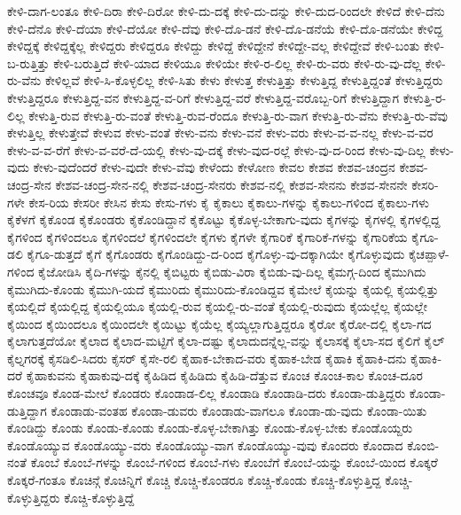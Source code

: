 {ಕೇಳಿ-ದಾಗ-ಲಂತೂ
ಕೇಳಿ-ದಿರಾ
ಕೇಳಿ-ದಿರೋ
ಕೇಳಿ-ದು-ದಕ್ಕೆ
ಕೇಳಿ-ದು-ದನ್ನು
ಕೇಳಿ-ದುದ-ರಿಂದಲೇ
ಕೇಳಿದೆ
ಕೇಳಿ-ದೆನು
ಕೇಳಿ-ದೆನೊ
ಕೇಳಿ-ದೆಯಾ
ಕೇಳಿ-ದೆಯೋ
ಕೇಳಿ-ದೆವು
ಕೇಳಿ-ದೊ-ಡನೆ
ಕೇಳಿ-ದೊ-ಡನೆಯೆ
ಕೇಳಿ-ದೊ-ಡನೆಯೇ
ಕೇಳಿದ್ದ
ಕೇಳಿದ್ದಕ್ಕೆ
ಕೇಳಿದ್ದಕ್ಕೆಲ್ಲ
ಕೇಳಿದ್ದರು
ಕೇಳಿದ್ದರೂ
ಕೇಳಿದ್ದು
ಕೇಳಿದ್ದೆ
ಕೇಳಿದ್ದೇನೆ
ಕೇಳಿದ್ದೇ-ವಲ್ಲ
ಕೇಳಿದ್ದೇವೆ
ಕೇಳಿ-ಬಂತು
ಕೇಳಿ-ಬ-ರುತ್ತಿತ್ತು
ಕೇಳಿ-ಬರುತ್ತಿದೆ
ಕೇಳಿ-ಯಾದ
ಕೇಳಿಯೂ
ಕೇಳಿಯೇ
ಕೇಳಿ-ರ-ಲಿಲ್ಲ
ಕೇಳಿ-ರು-ವರು
ಕೇಳಿ-ರು-ವು-ದೆಲ್ಲ
ಕೇಳಿ-ರು-ವೆನು
ಕೇಳಿಲ್ಲವೆ
ಕೇಳಿ-ಸಿ-ಕೊಳ್ಳಲಿಲ್ಲ
ಕೇಳಿ-ಸಿತು
ಕೇಳು
ಕೇಳುತ್ತ
ಕೇಳುತ್ತಿತ್ತು
ಕೇಳುತ್ತಿದ್ದ
ಕೇಳುತ್ತಿದ್ದಂತೆ
ಕೇಳುತ್ತಿದ್ದರು
ಕೇಳುತ್ತಿದ್ದರೂ
ಕೇಳುತ್ತಿದ್ದ-ವನ
ಕೇಳುತ್ತಿದ್ದ-ವ-ರಿಗೆ
ಕೇಳುತ್ತಿದ್ದ-ವರೆ
ಕೇಳುತ್ತಿದ್ದ-ವರೊಬ್ಬ-ರಿಗೆ
ಕೇಳುತ್ತಿದ್ದಾಗ
ಕೇಳುತ್ತಿ-ರ-ಲಿಲ್ಲ
ಕೇಳುತ್ತಿ-ರುವ
ಕೇಳುತ್ತಿ-ರು-ವಂತೆ
ಕೇಳುತ್ತಿ-ರುವ-ರೆಂದೂ
ಕೇಳುತ್ತಿ-ರು-ವಾಗ
ಕೇಳುತ್ತಿ-ರು-ವೆನು
ಕೇಳುತ್ತಿ-ರು-ವೆವು
ಕೇಳುತ್ತಿಲ್ಲ
ಕೇಳುತ್ತೇವೆ
ಕೇಳುವ
ಕೇಳು-ವಂತೆ
ಕೇಳು-ವನು
ಕೇಳು-ವನೆ
ಕೇಳು-ವರು
ಕೇಳು-ವ-ವ-ನಲ್ಲ
ಕೇಳು-ವ-ವರ
ಕೇಳು-ವ-ವ-ರೆಗೆ
ಕೇಳು-ವ-ವರೆ-ದೆ-ಯಲ್ಲಿ
ಕೇಳು-ವು-ದಕ್ಕೆ
ಕೇಳು-ವುದ-ರಲ್ಲೆ
ಕೇಳು-ವು-ದ-ರಿಂದ
ಕೇಳು-ವು-ದಿಲ್ಲ
ಕೇಳು-ವುದು
ಕೇಳು-ವುದೆಂದರೆ
ಕೇಳು-ವುದೇ
ಕೇಳು-ವೆವು
ಕೇಳೆಂದು
ಕೇಳೋಣ
ಕೇವಲ
ಕೇಶವ
ಕೇಶವ-ಚಂದ್ರನ
ಕೇಶವ-ಚಂದ್ರ-ಸೇನ
ಕೇಶವ-ಚಂದ್ರ-ಸೇನ-ನಲ್ಲಿ
ಕೇಶವ-ಚಂದ್ರ-ಸೇನರು
ಕೇಶವ-ನಲ್ಲಿ
ಕೇಶವ-ಸೇನನು
ಕೇಶವ-ಸೇನನೇ
ಕೇಸರಿ-ಗಳೇ
ಕೇಸ-ರಿಯ
ಕೇಸರೀ
ಕೇಸಿನ
ಕೇಸು
ಕೇಸು-ಗಳು
ಕೈ
ಕೈಕಾಲು
ಕೈಕಾಲು-ಗಳನ್ನು
ಕೈಕಾಲು-ಗಳಿಂದ
ಕೈಕಾಲು-ಗಳು
ಕೈಕೆಳಗೆ
ಕೈಕೊಂಡ
ಕೈಕೊಂಡರು
ಕೈಕೊಂಡಿದ್ದಾನೆ
ಕೈಕೊಟ್ಟು
ಕೈಕೊಳ್ಳ-ಬೇಕಾಗು-ವುದು
ಕೈಗಳನ್ನು
ಕೈಗಳಲ್ಲಿ
ಕೈಗಳಲ್ಲಿದ್ದ
ಕೈಗಳಿಂದ
ಕೈಗಳಿಂದಲೂ
ಕೈಗಳಿಂದಲೆ
ಕೈಗಳಿಂದಲೇ
ಕೈಗಳು
ಕೈಗಳೇ
ಕೈಗಾರಿಕೆ
ಕೈಗಾರಿಕೆ-ಗಳನ್ನು
ಕೈಗಾರಿಕೆಯ
ಕೈಗೂ-ಡಲಿ
ಕೈಗೂ-ಡುತ್ತದೆ
ಕೈಗೆ
ಕೈಗೊಂಡರು
ಕೈಗೊಂಡಿದ್ದು-ದ-ರಿಂದ
ಕೈಗೊಳ್ಳು-ವು-ದಕ್ಕಾಗಿಯೇ
ಕೈಗೊಳ್ಳುವುದು
ಕೈಚಪ್ಪಾಳೆ-ಗಳಿಂದ
ಕೈಜೋಡಿಸಿ
ಕೈದಿ-ಗಳನ್ನು
ಕೈನಲ್ಲಿ
ಕೈಬಿಟ್ಟರು
ಕೈಬಿಡು-ವಿರಾ
ಕೈಬಿಡು-ವು-ದಿಲ್ಲ
ಕೈಮಗ್ಗ-ದಿಂದ
ಕೈಮುಗಿದು
ಕೈಮುಗಿದು-ಕೊಂಡು
ಕೈಮುಗಿ-ಯದೆ
ಕೈಮುರಿದು
ಕೈಮುರಿದು-ಕೊಂಡಿದ್ದವ
ಕೈಮೇಲೆ
ಕೈಯನ್ನು
ಕೈಯಲ್ಲಿ
ಕೈಯಲ್ಲಿತ್ತು
ಕೈಯಲ್ಲಿದೆ
ಕೈಯಲ್ಲಿದ್ದ
ಕೈಯಲ್ಲಿಯೂ
ಕೈಯಲ್ಲಿ-ರುವ
ಕೈಯಲ್ಲಿ-ರು-ವಂತೆ
ಕೈಯಲ್ಲಿ-ರುವುದು
ಕೈಯಲ್ಲೆಲ್ಲ
ಕೈಯಲ್ಲೇ
ಕೈಯಿಂದ
ಕೈಯಿಂದಲೂ
ಕೈಯಿಂದಲೇ
ಕೈಯಿಟ್ಟು
ಕೈಯೆಲ್ಲ
ಕೈಯ್ಯಲ್ಲಾಗುತ್ತಿದ್ದರೂ
ಕೈರೋ
ಕೈರೋ-ದಲ್ಲಿ
ಕೈಲಾ-ಗದ
ಕೈಲಾಗುತ್ತದೆಯೋ
ಕೈಲಾದ
ಕೈಲಾದ-ಮಟ್ಟಿಗೆ
ಕೈಲಾ-ದಷ್ಟು
ಕೈಲಾದುದನ್ನೆಲ್ಲ-ವನ್ನು
ಕೈಲಾಸಕ್ಕೆ
ಕೈಲಾ-ಸದ
ಕೈಲಿಗೆ
ಕೈಲ್
ಕೈಲ್ನಗರಕ್ಕೆ
ಕೈಸಡಿಲಿ-ಸಿದರು
ಕೈಸರ್
ಕೈಸೇ-ರಲಿ
ಕೈಹಾಕ-ಬೇಕಾದ-ವರು
ಕೈಹಾಕ-ಬೇಡ
ಕೈಹಾಕಿ
ಕೈಹಾಕಿ-ದನು
ಕೈಹಾಕಿ-ದರೆ
ಕೈಹಾಕುವನು
ಕೈಹಾಕುವು-ದಕ್ಕೆ
ಕೈಹಿಡಿದ
ಕೈಹಿಡಿದು
ಕೈಹಿಡಿ-ದೆತ್ತುವ
ಕೊಂಚ
ಕೊಂಚ-ಕಾಲ
ಕೊಂಚ-ದೂರ
ಕೊಂಚವೂ
ಕೊಂಡ-ಮೇಲೆ
ಕೊಂಡರು
ಕೊಂಡಾಡ-ಲಿಲ್ಲ
ಕೊಂಡಾಡಿ
ಕೊಂಡಾಡಿ-ದರು
ಕೊಂಡಾ-ಡುತ್ತಿದ್ದರು
ಕೊಂಡಾ-ಡುತ್ತಿದ್ದಾಗ
ಕೊಂಡಾಡು-ವಂತಹ
ಕೊಂಡಾ-ಡುವರು
ಕೊಂಡಾಡು-ವಾಗಲೂ
ಕೊಂಡಾ-ಡು-ವುದು
ಕೊಂಡಾ-ಯಿತು
ಕೊಂಡಿದ್ದು
ಕೊಂಡು
ಕೊಂಡು-ಕೊಂಡು
ಕೊಂಡು-ಕೊಳ್ಳ-ಬೇಕಾಗಿತ್ತು
ಕೊಂಡು-ಕೊಳ್ಳ-ಬೇಕು
ಕೊಂಡೊಯ್ದರು
ಕೊಂಡೊಯ್ಯುವ
ಕೊಂಡೊಯ್ಯು-ವರು
ಕೊಂಡೊಯ್ಯು-ವಾಗ
ಕೊಂಡೊಯ್ಯು-ವುವು
ಕೊಂದರು
ಕೊಂದಾದ
ಕೊಂಬಿ-ನಂತೆ
ಕೊಂಬೆ
ಕೊಂಬೆ-ಗಳನ್ನು
ಕೊಂಬೆ-ಗಳಿಂದ
ಕೊಂಬೆ-ಗಳು
ಕೊಂಬೆಗೆ
ಕೊಂಬೆ-ಯನ್ನು
ಕೊಂಬೆ-ಯಿಂದ
ಕೊಕ್ಕರೆ
ಕೊಕ್ಕರೆ-ಗಂತೂ
ಕೊಚಿನ್ಗೆ
ಕೊಚಿನ್ನಿಗೆ
ಕೊಚ್ಚಿ
ಕೊಚ್ಚಿ-ಕೊಂಡರೂ
ಕೊಚ್ಚಿ-ಕೊಂಡು
ಕೊಚ್ಚಿ-ಕೊಳ್ಳುತ್ತಿದ್ದ
ಕೊಚ್ಚಿ-ಕೊಳ್ಳುತ್ತಿದ್ದರು
ಕೊಚ್ಚಿ-ಕೊಳ್ಳುತ್ತಿದ್ದೆ
}
